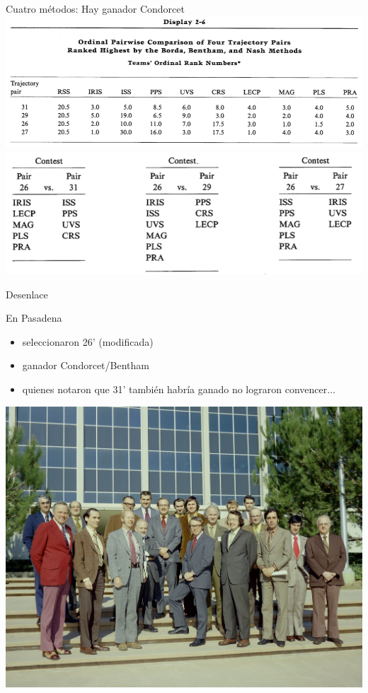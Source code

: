 \documentclass[bigger]{beamer}
\begin{document}
\begin{frame}[label={sec:org9516581}]{Cuatro métodos: Hay ganador Condorcet}
\centering
\includegraphics[width=\textwidth]{./pics/rk4.png} \\[0pt]
\pause
\includegraphics[width=\textwidth]{./pics/rk5.png}
\end{frame}
\begin{frame}[label={sec:org204caba}]{Desenlace}
\begin{block}{En Pasadena}
\begin{itemize}
\item seleccionaron 26' (modificada)
\item ganador Condorcet/Bentham
\item quienes notaron que 31' también habría ganado no lograron convencer\(\ldots\)
\end{itemize}
\end{block}
\centering
\includegraphics[width=.6\textwidth]{./pics/jpl-oct-1973.jpg} \\[0pt]
\end{frame}
\end{document}
